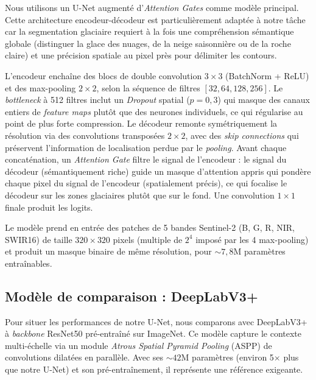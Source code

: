 \documentclass[11pt]{article}
\begin{document}
Nous utilisons un U-Net \citep{ronneberger2015unet} augmenté d'\emph{Attention Gates} \citep{AttentionGates2018} comme modèle principal. Cette architecture encodeur-décodeur est particulièrement adaptée à notre tâche car la segmentation glaciaire requiert à la fois une compréhension sémantique globale (distinguer la glace des nuages, de la neige saisonnière ou de la roche claire) et une précision spatiale au pixel près pour délimiter les contours.



L'encodeur enchaîne des blocs de double convolution $3{\times}3$ (BatchNorm \citep{BatchNorm2015} + ReLU) et des max-pooling $2{\times}2$, selon la séquence de filtres $[32, 64, 128, 256]$. Le \emph{bottleneck} à 512 filtres inclut un \emph{Dropout} spatial \citep{Dropout2014} ($p=0{,}3$) qui masque des canaux entiers de \emph{feature maps} plutôt que des neurones individuels, ce qui régularise au point de plus forte compression. Le décodeur remonte symétriquement la résolution via des convolutions transposées $2{\times}2$, avec des \textit{skip connections} \citep{SkipConnections2015} qui préservent l'information de localisation perdue par le \emph{pooling}. Avant chaque concaténation, un \emph{Attention Gate} filtre le signal de l'encodeur : le signal du décodeur (sémantiquement riche) guide un masque d'attention appris qui pondère chaque pixel du signal de l'encodeur (spatialement précis), ce qui focalise le décodeur sur les zones glaciaires plutôt que sur le fond. Une convolution $1{\times}1$ finale produit les logits.

Le modèle prend en entrée des patches de 5 bandes Sentinel-2 (B, G, R, NIR, SWIR16) de taille $320{\times}320$ pixels (multiple de $2^4$ imposé par les 4 max-pooling) et produit un masque binaire de même résolution, pour ${\sim}7{,}8$M paramètres entraînables.

\subsection{Modèle de comparaison : DeepLabV3+}

Pour situer les performances de notre U-Net, nous comparons avec DeepLabV3+ \citep{DeepLabV3Plus2018} à \emph{backbone} ResNet50 \citep{ResNet2015} pré-entraîné sur ImageNet. Ce modèle capture le contexte multi-échelle via un module \textit{Atrous Spatial Pyramid Pooling} (ASPP) de convolutions dilatées en parallèle. Avec ses ${\sim}42$M paramètres (environ 5$\times$ plus que notre U-Net) et son pré-entraînement, il représente une référence exigeante.
\end{document}
